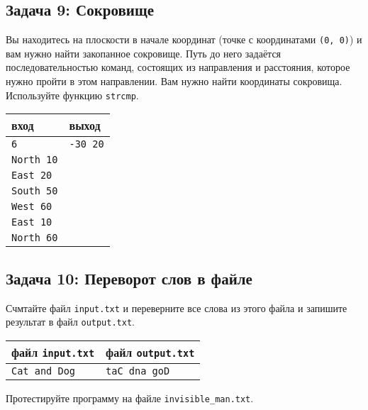 \documentclass{article}
\begin{document}
\subsection*{Задача 9: Сокровище}
Вы находитесь на плоскости в начале координат (точке с координатами \texttt{(0, 0)}) и вам нужно найти закопанное сокровище. Путь до него задаётся последовательностью команд, состоящих из направления и расстояния, которое нужно пройти в этом направлении. Вам нужно найти координаты сокровища. Используйте функцию \texttt{strcmp}.
\begin{center} 
\begin{tabular}{ l | l }
 вход & выход \\ \hline
 \texttt{6} & \texttt{-30 20}\\
 \texttt{North 10} & \\
 \texttt{East 20} &\\
 \texttt{South 50} &\\
 \texttt{West 60} &\\
 \texttt{East 10} &\\
 \texttt{North 60} &\\
\end{tabular}
\end{center}

\subsection*{Задача 10: Переворот слов в файле}
Счмтайте файл \texttt{input.txt}  и переверните все слова из этого файла и запишите результат в файл \texttt{output.txt}.
\begin{center} 
\begin{tabular}{ l | l }
 файл \texttt{input.txt} & файл \texttt{output.txt} \\ \hline
 \texttt{Cat and Dog} & \texttt{taC dna goD}\\
\end{tabular}
\end{center}
Протестируйте программу на файле \texttt{invisible\_man.txt}.
\end{document}

